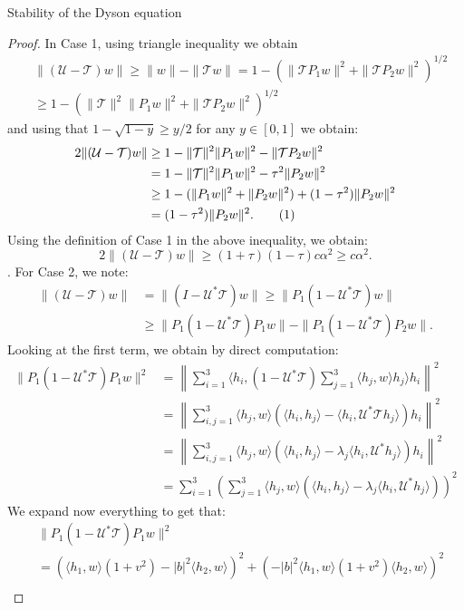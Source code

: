 \documentclass[11pt, a4paper, oneside]{book}
\numberwithin{equation}{chapter}
\newcommand{\TT}{\mathcal{T}}
\newcommand{\UU}{\mathcal{U}}
\newcommand\numberthis{\addtocounter{equation}{1}\tag{\theequation}}
\begin{document}
\begin{section}{Stability of the Dyson equation}
\begin{proof}
\pagebreak
%
In Case 1,
using triangle inequality we obtain
\begin{align*}
&\|(\UU - \TT)w\| \geq \|w\| - \|\TT w\| = 1 -(\|\TT P_1w\|^2 + \|\TT P_2w\|^2)^{1/2} \\ 
&\geq 1 -(\|\TT\|^2 \|P_1w\|^2 + \|\TT P_2w\|^2)^{1/2}
\end{align*}
and using that $1 - \sqrt{1-y} \geq y/2$ for any $y \in [0, 1]$ we obtain:
%
\begin{align*}
2\|(\UU - \TT)w\| &\geq 1 - \|\TT\|^2 \|P_1w\|^2 - \|\TT P_2w\|^2 \\
&= 1 - \|\TT\|^2 \|P_1w\|^2 - \tau^2\|P_2w\|^2 \\
&\geq 1 - (\|P_1w\|^2+ \|P_2w\|^2) + (1-\tau^2)\|P_2w\|^2\\
&= (1-\tau^2)\|P_2w\|^2 . \numberthis
\end{align*}
%
Using the definition of Case 1 in the above inequality, we obtain:
\begin{equation}
2\|(\UU - \TT)w\| \geq (1+\tau)(1-\tau)c \alpha^2
\geq c \alpha^2.
\end{equation}.
%
For Case 2, we note:
%
\begin{align*}
\| (\UU - \TT)w\| &= \|(I - \UU^*\TT)w\|
\geq \|P_{1} (1 - \UU^* \TT)w\|
\\
&\geq  \|P_{1} (1 - \UU^* \TT)P_1w\| - \|P_{1} (1 - \UU^* \TT)P_2w\|.
\end{align*}
%
Looking at the first term, we obtain by direct computation:
%
\begin{align*}\label{e:stabComputation}
\|P_1 (1 - \UU^* \TT)P_1w\|^2 &= \left \|\sum_{i = 1}^3 \langle h_i, (1 - \UU^* \TT) \sum_{j=1}^3 \langle h_j, w \rangle h_j\rangle h_i \right \|^2 \\
&= \left \|\sum_{i,j = 1}^3 \langle h_j, w \rangle (\langle h_i, h_j\rangle - \langle h_i, \UU^* \TT  h_j\rangle) h_i \right \|^2
\\
&= \left \|\sum_{i,j = 1}^3 \langle h_j, w \rangle (\langle h_i, h_j\rangle - \lambda_j \langle h_i, \UU^*  h_j\rangle) h_i \right \|^2
\\
&= \sum_{i=1}^3 \left( \sum_{j=1}^3 \langle h_j, w \rangle (\langle h_i, h_j\rangle - \lambda_j \langle h_i, \UU^*  h_j\rangle) \right)^2
\end{align*}
We expand now everything to get that:
\begin{align*}
&\|P_1 (1 - \UU^* \TT)P_1w\|^2 \\
&=\left( \langle h_1, w \rangle (1 +v^2) - |b|^2 \langle h_2, w \rangle\right)^2 + \left( -|b|^2\langle h_1, w \rangle (1 +v^2) \langle h_2, w \rangle\right)^2 \\

\end{align*}
\end{proof}
\end{section}
\end{document}
